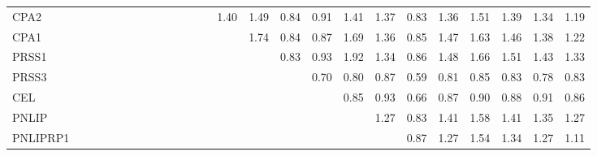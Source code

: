 \begin{longtable}{lrrrrrrrrrrrrrrrrrrrrrrrr}
CPA2     &              &              &              &              &             &             &             &             &            &              &            &            &       1.40 &        1.49 &        0.84 &      0.91 &        1.41 &           1.37 &      0.83 &          1.36 &      1.51 &        1.39 &        1.34 &       1.19 \\
CPA1     &              &              &              &              &             &             &             &             &            &              &            &            &            &        1.74 &        0.84 &      0.87 &        1.69 &           1.36 &      0.85 &          1.47 &      1.63 &        1.46 &        1.38 &       1.22 \\
PRSS1    &              &              &              &              &             &             &             &             &            &              &            &            &            &             &        0.83 &      0.93 &        1.92 &           1.34 &      0.86 &          1.48 &      1.66 &        1.51 &        1.43 &       1.33 \\
PRSS3    &              &              &              &              &             &             &             &             &            &              &            &            &            &             &             &      0.70 &        0.80 &           0.87 &      0.59 &          0.81 &      0.85 &        0.83 &        0.78 &       0.83 \\
CEL      &              &              &              &              &             &             &             &             &            &              &            &            &            &             &             &           &        0.85 &           0.93 &      0.66 &          0.87 &      0.90 &        0.88 &        0.91 &       0.86 \\
PNLIP    &              &              &              &              &             &             &             &             &            &              &            &            &            &             &             &           &             &           1.27 &      0.83 &          1.41 &      1.58 &        1.41 &        1.35 &       1.27 \\
PNLIPRP1 &              &              &              &              &             &             &             &             &            &              &            &            &            &             &             &           &             &                &      0.87 &          1.27 &      1.54 &        1.34 &        1.27 &       1.11 \\

\end{longtable}
